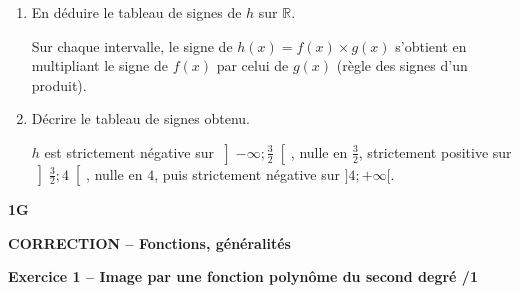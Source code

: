 \documentclass[10pt,a4paper]{article}
\renewcommand{\niveau}{1G}
\renewcommand{\chapitre}{Fonctions, généralités}
\renewcommand{\interroversion}[1]{
    \noindent\textbf{\niveau}

    \vspace{-0.5cm}
    \begin{center}
        \textbf{\large CORRECTION -- \chapitre}
    \end{center}

    \vspace{0.1cm}
}
\begin{document}
\begin{sujets}
\begin{enumerate}
\begin{center}
\begin{minipage}{0.48\linewidth}
\(f\) a pour coefficient directeur \(a=2>0\) : \(f\) est croissante.
\[
\begin{aligned}
f(x)&>0\\
2x-3&>0 &\scriptstyle(+3)\\
2x&>3 &\scriptstyle(\div 2)\\
x&>\frac{3}{2}.
\end{aligned}
\]
\end{minipage}
\hfill
\begin{minipage}{0.48\linewidth}
\(g\) a pour coefficient directeur \(a=-1<0\) : \(g\) est décroissante.
\[
\begin{aligned}
g(x)&>0\\
-x+4&>0 &\scriptstyle(-4)\\
-x&>-4 &\scriptstyle(\div(-1))\\
x&<4.
\end{aligned}
\]
\end{minipage}
\end{center}

\item En déduire le tableau de signes de \(h\) sur \(\mathbb{R}\).

Sur chaque intervalle, le signe de \(h(x)=f(x)\times g(x)\) s'obtient en multipliant le signe de \(f(x)\) par celui de \(g(x)\) (règle des signes d'un produit).

\begin{center}
\end{center}

\item Décrire le tableau de signes obtenu.

\(h\) est strictement négative sur \(\left]-\infty;\frac{3}{2}\right[\), nulle en \(\frac{3}{2}\), strictement positive sur \(\left]\frac{3}{2};4\right[\), nulle en \(4\), puis strictement négative sur \(]4;+\infty[\).
\end{enumerate}

\columnbreak

\interroversion{B}

\textbf{Exercice 1 -- Image par une fonction polynôme du second degré \hfill /1}


\end{sujets}
\end{document}
